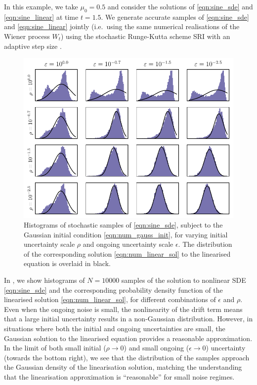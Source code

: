 In this example, we take \(\mu_0 = 0.5\) and consider the solutions of \cref{eqn:sine_sde} and \cref{eqn:sine_linear} at time \(t = 1.5\).
We generate accurate samples of \cref{eqn:sine_sde} and \cref{eqn:sine_linear} jointly (i.e.\ using the same numerical realisations of the Wiener process \(W_t\)) using the stochastic Runge-Kutta scheme SRI \citep{Rossler_2010_RungeKuttaMethodsStrong} with an adaptive step size \citep{RackauckasNie_2017_AdaptiveMethodsStochastic}.

\begin{figure}
	\begin{center}
		\includegraphics[width=\textwidth]{chp04_paper_numerics/figures/sine/selected_hists.pdf}
		\caption{Histograms of stochastic samples of \cref{eqn:sine_sde}, subject to the Gaussian initial condition \cref{eqn:num_gauss_init}, for varying initial uncertainty scale \(\rho\) and ongoing uncertainty scale \(\epsilon\).
			The distribution of the corresponding solution \cref{eqn:num_linear_sol} to the linearised equation is overlaid in black.}
		\label{fig:sine_hists}
	\end{center}
\end{figure}

In , we show histograms of \(N = 10000\) samples of the solution to nonlinear SDE \cref{eqn:sine_sde} and the corresponding probability density function of the linearised solution \cref{eqn:num_linear_sol}, for different combinations of \(\epsilon\) and \(\rho\).
Even when the ongoing noise is small, the nonlinearity of the drift term means that a large initial uncertainty results in a non-Gaussian distribution.
However, in situations where both the initial and ongoing uncertainties are small, the Gaussian solution to the linearised equation provides a reasonable approximation.
In the limit of both small initial (\(\rho \to 0\)) and small ongoing (\(\epsilon \to 0\)) uncertainty (towards the bottom right), we see that the distribution of the samples approach the Gaussian density of the linearisation solution, matching the understanding that the linearisation approximation is ``reasonable'' for small noise regimes.

